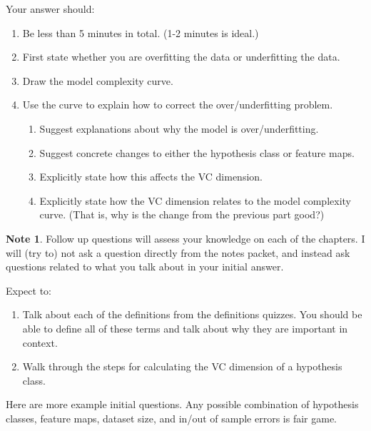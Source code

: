 \documentclass[10pt]{exam}
\theoremstyle{definition}
\newtheorem{note}{Note}
\begin{document}
\noindent
Your answer should:
\begin{enumerate}
    \item Be less than 5 minutes in total.  (1-2 minutes is ideal.)
    \item First state whether you are overfitting the data or underfitting the data.

        \vspace{2in}
    \item Draw the model complexity curve.

        \vspace{3.5in}

    \item Use the curve to explain how to correct the over/underfitting problem.
        \begin{enumerate}
            \item Suggest explanations about why the model is over/underfitting.
            \item Suggest concrete changes to either the hypothesis class or feature maps.
            \item Explicitly state how this affects the VC dimension.
            \item Explicitly state how the VC dimension relates to the model complexity curve.
                (That is, why is the change from the previous part good?)
        \end{enumerate}
\end{enumerate}

\newpage
\begin{note}
    Follow up questions will assess your knowledge on each of the chapters.
    I will (try to) not ask a question directly from the notes packet,
    and instead ask questions related to what you talk about in your initial answer.

    Expect to:
    \begin{enumerate}
        \item Talk about each of the definitions from the definitions quizzes.
            You should be able to define all of these terms and talk about why they are important in context.

        \item Walk through the steps for calculating the VC dimension of a hypothesis class.
    \end{enumerate}
\end{note}

\newpage
\noindent
Here are more example initial questions.
Any possible combination of hypothesis classes, feature maps, dataset size, and in/out of sample errors is fair game.
\end{document}
